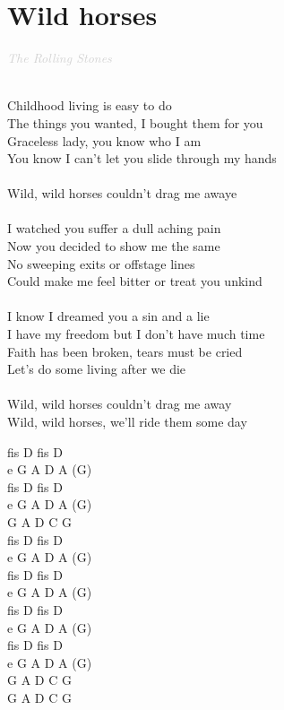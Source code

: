 \documentclass[a5paper, 10pt]{book}
\begin{document}
\section{Wild horses}\textcolor{lightgray}{\textit{The Rolling Stones}}\\~\\
\begin{minipage}[t]{0.75\textwidth}
Childhood living is easy to do\\
The things you wanted, I bought them for you\\
Graceless lady, you know who I am\\
You know I can't let you slide through my hands\\
\\
\hspace*{5mm}Wild, wild horses couldn't drag me awaye\\
\\
I watched you suffer a dull aching pain\\
Now you decided to show me the same\\
No sweeping exits or offstage lines\\
Could make me feel bitter or treat you unkind\\
\\
I know I dreamed you a sin and a lie\\
I have my freedom but I don't have much time\\
Faith has been broken, tears must be cried\\
Let's do some living after we die\\
\\
\hspace*{5mm}Wild, wild horses couldn't drag me away\\
\hspace*{5mm}Wild, wild horses, we'll ride them some day\\
\end{minipage}
\begin{minipage}[t]{0.25\textwidth}
fis D fis D\\
e G A D A (G)\\
fis D fis D\\
e G A D A (G)\\

G A D C G \\

fis D fis D\\
e G A D A (G)\\
fis D fis D\\
e G A D A (G)\\

fis D fis D\\
e G A D A (G)\\
fis D fis D\\
e G A D A (G)\\

G A D C G \\
G A D C G \\
\end{minipage}
\end{document}
